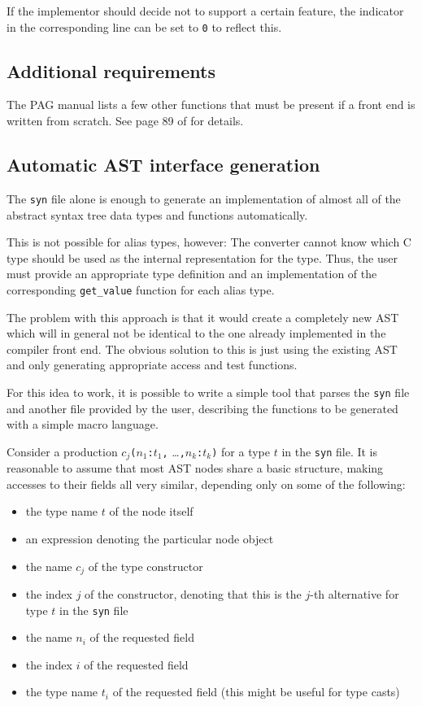 If the implementor should decide not to support a certain feature,
the indicator in the corresponding line can be set to \verb|0| to
reflect this.

\subsection{Additional requirements}

The PAG manual lists a few other functions that must be present if a
front end is written from scratch. See page 89 of \cite{pag} for
details.

\subsection{Automatic AST interface generation}

The \verb|syn| file alone is enough to generate an implementation of
almost all of the abstract syntax tree data types and functions
automatically.

This is not possible for alias types, however: The converter cannot
know which C type should be used as the internal representation for
the type. Thus, the user must provide an appropriate type definition
and an implementation of the corresponding \verb|get_value| function
for each alias type.

The problem with this approach is that it would create a completely
new AST which will in general not be identical to the one already
implemented in the compiler front end. The obvious solution to this
is just using the existing AST and only generating appropriate
access and test functions.

For this idea to work, it is possible to write a simple tool that
parses the \verb|syn| file and another file provided by the user,
describing the functions to be generated with a simple macro
language.

Consider a production \(c_j\)\verb|(|\(n_1\)\verb|:|\(t_1\)\verb|,|
\ldots\verb|,|\(n_k\)\verb|:|\(t_k\)\verb|)| for a type \(t\) in the
\verb|syn| file. It is reasonable to assume that most AST nodes
share a basic structure, making accesses to their fields all very
similar, depending only on some of the following:

\begin{itemize}
\item the type name \(t\) of the node itself
\item an expression denoting the particular node object
\item the name \(c_j\) of the type constructor
\item the index \(j\) of the constructor, denoting that this is the
    \(j\)-th alternative for type \(t\) in the \verb|syn| file
\item the name \(n_i\) of the requested field
\item the index \(i\) of the requested field
\item the type name \(t_i\) of the requested field (this might be
    useful for type casts)
\end{itemize}

